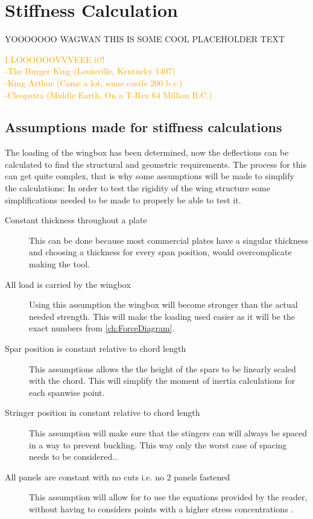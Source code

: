 \chapter{Stiffness Calculation}
\label{ch:Stiff_Calc}



YOOOOOOO WAGWAN THIS IS SOME COOL PLACEHOLDER TEXT

\textcolor{orange}{I LOOOOOOVVVEEE it!! \\
    -The Burger King (Louisville, Kentucky 1407)\\
        -King Arthur (Came a lot, some castle 200 b.c.)\\
            -Cleopatra (Middle Earth, On a T-Rex 64 Million B.C.)}
\section{Assumptions made for stiffness calculations}
The loading of the wingbox has been determined, now the deflections can be calculated to find the structural and geometric requirements. The process for this can get quite complex, that is why some  assumptions will be made to simplify the calculations:
    In order to test the rigidity of the wing structure some simplifications needed to be made to properly be able to test it.
\begin{description}
    \item[Constant thickness throughout a plate] This can be done because most commercial plates have a singular thickness and choosing a thickness for every span position, would overcomplicate making the tool.

    \item[All load is carried by the wingbox] Using this assumption the wingbox will become stronger than the actual needed strength. This will make the loading used easier as it will be the exact numbers from \autoref{ch:ForceDiagram}.

    \item[Spar position is constant relative to chord length] This assumptions allows the the height of the spars to be linearly scaled with the chord. This will simplify the moment of inertia calculations for each spanwise point.

    \item[Stringer position in constant relative to chord length] This assumption will make sure that the stingers can will always be spaced in a way to prevent buckling. This way only the worst case of spacing needs to be considered.. 

    \item[All panels are constant with no cuts i.e. no 2 panels fastened] This assumption will allow for to use the equations provided by the reader, without having to considers points with a higher stress concentrations \cite{Timmer2024ProjectDesign}.
\end{description}
    
